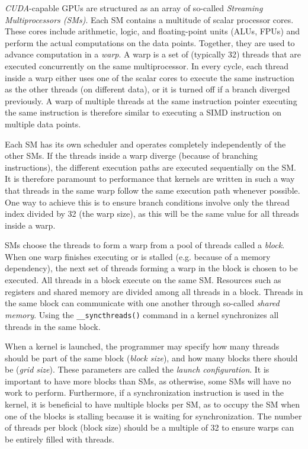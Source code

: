 \emph{CUDA}-capable GPUs are structured as an array of so-called \emph{Streaming Multiprocessors (SMs)}. Each SM contains a multitude of scalar processor cores. These cores include arithmetic, logic, and floating-point units (ALUs, FPUs) and perform the actual computations on the data points. Together, they are used to advance computation in a \emph{warp}. A warp is a set of (typically 32) threads that are executed concurrently on the same multiprocessor. In every cycle, each thread inside a warp either uses one of the scalar cores to execute the same instruction as the other threads (on different data), or it is turned off if a branch diverged previously. A warp of multiple threads at the same instruction pointer executing the same instruction is therefore similar to executing a SIMD instruction on multiple data points.

Each SM has its own scheduler and operates completely independently of the other SMs. If the threads inside a warp diverge (because of branching instructions), the different execution paths are executed sequentially on the SM. It is therefore paramount to performance that kernels are written in such a way that threads in the same warp follow the same execution path whenever possible. One way to achieve this is to ensure branch conditions involve only the thread index divided by 32 (the warp size), as this will be the same value for all threads inside a warp. 

SMs choose the threads to form a warp from a pool of threads called a \emph{block}. When one warp finishes executing or is stalled (e.g. because of a memory dependency), the next set of threads forming a warp in the block is chosen to be executed. All threads in a block execute on the same SM. Resources such as registers and shared memory are divided among all threads in a block. Threads in the same block can communicate with one another through so-called \emph{shared memory}. Using the \texttt{\_\_syncthreads()} command in a kernel synchronizes all threads in the same block.

When a kernel is launched, the programmer may specify how many threads should be part of the same block (\emph{block size}), and how many blocks there should be (\emph{grid size}). These parameters are called the \emph{launch configuration}. It is important to have more blocks than SMs, as otherwise, some SMs will have no work to perform. Furthermore, if a synchronization instruction is used in the kernel, it is beneficial to have multiple blocks per SM, as to occupy the SM when one of the blocks is stalling because it is waiting for synchronization. The number of threads per block (block size) should be a multiple of 32 to ensure warps can be entirely filled with threads. \cite[Section~10]{cuda-best-practices}

